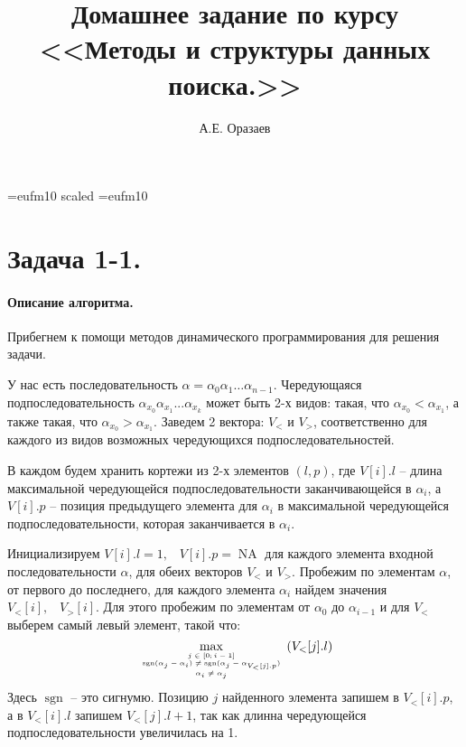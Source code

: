 \documentclass[12pt]{article}
\title{\bf Домашнее задание по курсу \\ <<Методы
и структуры данных поиска.>>}
\author{А.Е. Оразаев}
\date{}
\newcommand{\sgn}{\operatorname{sgn}}
\newcommand{\NA}{\operatorname{NA}}
\begin{document}
\voffset=-20mm 
\hoffset=-12mm
\font\Got=eufm10 scaled \font\Got=eufm10

\maketitle

\section{Задача 1-1.}
\paragraph{Описание алгоритма.}
Прибегнем к помощи методов динамического программирования для решения задачи.

У нас есть последовательность $ \alpha = \alpha_0\alpha_1\dots\alpha_{n-1} $.
Чередующаяся подпоследовательность $ \alpha_{x_0}\alpha_{x_1}...\alpha_{x_k} $ 
может быть 2-х видов: такая, что $ \alpha_{x_0} < \alpha_{x_1} $, а также такая, что
$ \alpha_{x_0} > \alpha_{x_1} $.  Заведем 2 вектора: $ V_< $ и $ V_> $, соответственно 
для каждого из видов возможных чередующихся подпоследовательностей.

В каждом будем хранить кортежи из 2-х элементов $(l, p)$, где $ V[i].l $ -- 
длина максимальной чередующейся подпоследовательности заканчивающейся в $ \alpha_i $, 
а $ V[i].p $ -- позиция предыдущего элемента для $ \alpha_i $ в максимальной 
чередующейся подпоследовательности, которая заканчивается в $ \alpha_i $.

Инициализируем $ V[i].l = 1, \;\;\; V[i].p = \NA $ для каждого элемента входной 
последовательности $ \alpha $, для обеих векторов $ V_< $ и $ V_> $.
Пробежим по элементам $ \alpha $, от первого до последнего, для каждого элемента
$ \alpha_i $ найдем значения $ V_<[i], \;\;\; V_>[i] $. Для этого пробежим по
элементам от $ \alpha_0 $ до $ \alpha_{i-1} $ и для $ V_< $ выберем самый левый элемент,
такой что:
$$ 
    \max\limits_{\tiny\begin{array}{c} j \in [0; i - 1] \\ \sgn(\alpha_j - \alpha_i) \ne \sgn(\alpha_j - \alpha_{V_<[j].p}) \\ \alpha_i \ne \alpha_j \end{array} } (V_<[j].l)
$$
Здесь $ \sgn $ -- это сигнумю. Позицию $ j $ найденного элемента запишем в 
$ V_<[i].p $, а в $ V_<[i].l $ запишем $ V_<[j].l + 1 $, так как длинна 
чередующейся подпоследовательности увеличилась на 1.
\end{document}
